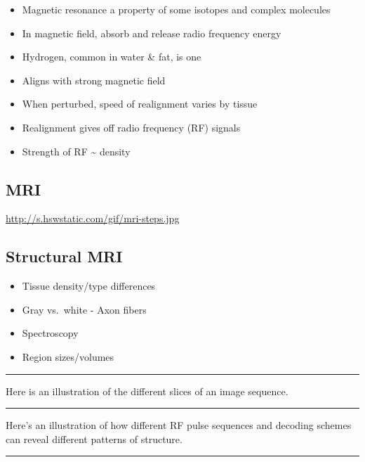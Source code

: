 \documentclass[]{article}
\providecommand{\tightlist}{%
  \setlength{\itemsep}{0pt}\setlength{\parskip}{0pt}}
\begin{document}
\begin{itemize}
\tightlist
\item
  Magnetic resonance a property of some isotopes and complex molecules
\item
  In magnetic field, absorb and release radio frequency energy
\item
  Hydrogen, common in water \& fat, is one
\item
  Aligns with strong magnetic field
\item
  When perturbed, speed of realignment varies by tissue
\item
  Realignment gives off radio frequency (RF) signals
\item
  Strength of RF \textasciitilde{} density
\end{itemize}

\subsection{MRI}\label{mri}

\url{http://s.hswstatic.com/gif/mri-steps.jpg}

\subsection{Structural MRI}\label{structural-mri}

\begin{itemize}
\tightlist
\item
  Tissue density/type differences
\item
  Gray vs.~white - Axon fibers
\item
  Spectroscopy
\item
  Region sizes/volumes
\end{itemize}

\begin{center}\rule{0.5\linewidth}{\linethickness}\end{center}

Here is an illustration of the different slices of an image sequence.

\begin{center}\rule{0.5\linewidth}{\linethickness}\end{center}

Here's an illustration of how different RF pulse sequences and decoding
schemes can reveal different patterns of structure.

\begin{center}\rule{0.5\linewidth}{\linethickness}\end{center}
\end{document}
